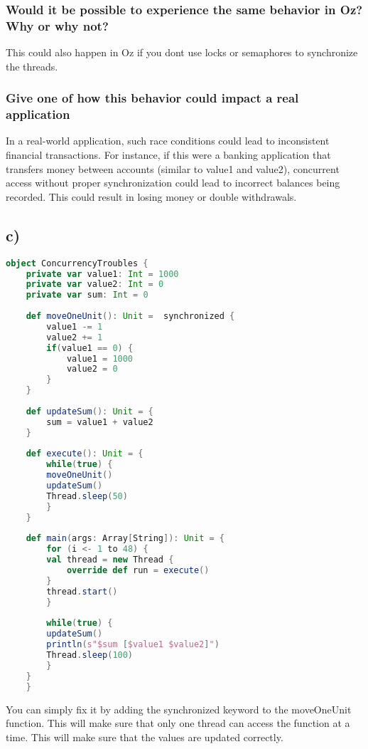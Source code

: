 \documentclass[11pt,a4paper]{report}
\begin{document}
\subsubsection{Would it be possible to experience the same behavior in Oz? Why or why not?}
This could also happen in Oz if you dont use locks or semaphores to synchronize the threads.
\subsubsection{Give one of how this behavior could impact a real application}

In a real-world application, such race conditions could lead to inconsistent financial transactions. For instance, if this were a banking application that transfers money between accounts (similar to value1 and value2), concurrent access without proper synchronization could lead to incorrect balances being recorded. This could result in losing money or double withdrawals.

\subsection{c)}
\begin{lstlisting}[language=scala]
object ConcurrencyTroubles {
    private var value1: Int = 1000
    private var value2: Int = 0
    private var sum: Int = 0
    
    def moveOneUnit(): Unit =  synchronized {
        value1 -= 1
        value2 += 1
        if(value1 == 0) {
            value1 = 1000
            value2 = 0
        }
    }
    
    def updateSum(): Unit = {
        sum = value1 + value2
    }
    
    def execute(): Unit = {
        while(true) {
        moveOneUnit()
        updateSum()
        Thread.sleep(50)
        }
    }
    
    def main(args: Array[String]): Unit = {
        for (i <- 1 to 48) {
        val thread = new Thread {
            override def run = execute()
        }
        thread.start()
        }
        
        while(true) {
        updateSum()
        println(s"$sum [$value1 $value2]")
        Thread.sleep(100)
        }
    }
    }
\end{lstlisting}
You can simply fix it by adding the synchronized keyword to the moveOneUnit function. This will make sure that only one thread can access the function at a time. This will make sure that the values are updated correctly.
\end{document}
